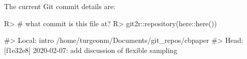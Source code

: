 \documentclass[
]{jss}
\begin{document}
The current Git commit details are:

\begin{CodeChunk}

\begin{CodeInput}
R> # what commit is this file at? 
R> git2r::repository(here::here())
\end{CodeInput}

\begin{CodeOutput}
#> Local:    intro /home/turgeonm/Documents/git_repos/cbpaper
#> Head:     [f1e32e8] 2020-02-07: add discussion of flexible sampling
\end{CodeOutput}
\end{CodeChunk}


\end{document}
